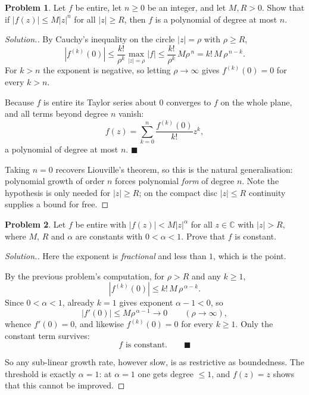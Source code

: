\documentclass[11pt,a4paper]{article}
\theoremstyle{definition}
\newtheorem{problemx}{Problem}[section]
\newenvironment{problem}{\begin{problemx}}{\end{problemx}}
\newenvironment{solution}
  {\renewcommand{\qedsymbol}{}\begin{proof}[\textit{Solution}.]}
  {\end{proof}}
\begin{document}
\begin{problem}
Let $f$ be entire, let $n \geq 0$ be an integer, and let $M, R > 0$. Show that if
$\left|f(z)\right| \leq M\left|z\right|^{n}$ for all $\left|z\right| \geq R$,
then $f$ is a polynomial of degree at most $n$.
\end{problem}

\begin{solution}
By Cauchy's inequality on the circle $\left|z\right| = \rho$ with $\rho \geq R$,
$$\left|f^{(k)}(0)\right| \leq \frac{k!}{\rho^{k}}\max_{\left|z\right|=\rho}\left|f\right|
\leq \frac{k!}{\rho^{k}}\,M\rho^{\,n} = k!\,M\,\rho^{\,n-k}.$$
For $k > n$ the exponent is negative, so letting $\rho \rightarrow \infty$ gives
$f^{(k)}(0) = 0$ for every $k > n$.

Because $f$ is entire its Taylor series about $0$ converges to $f$ on the whole
plane, and all terms beyond degree $n$ vanish:
$$\boxed{f(z) = \sum^{n}_{k=0}\frac{f^{(k)}(0)}{k!}z^{k},}$$
a polynomial of degree at most $n$. $\blacksquare$

Taking $n = 0$ recovers Liouville's theorem, so this is the natural generalisation:
polynomial growth of order $n$ forces polynomial \emph{form} of degree $n$. Note
the hypothesis is only needed for $\left|z\right| \geq R$; on the compact disc
$\left|z\right| \leq R$ continuity supplies a bound for free.
\end{solution}


\begin{problem}
Let $f$ be entire with $\left|f(z)\right| < M\left|z\right|^{\alpha}$ for all
$z \in \mathbb{C}$ with $\left|z\right| > R$, where $M$, $R$ and $\alpha$ are
constants with $0 < \alpha < 1$. Prove that $f$ is constant.
\end{problem}

\begin{solution}
Here the exponent is \emph{fractional} and less than $1$, which is the point.

By the previous problem's computation, for $\rho > R$ and any $k \geq 1$,
$$\left|f^{(k)}(0)\right| \leq k!\,M\,\rho^{\,\alpha-k}.$$
Since $0 < \alpha < 1$, already $k = 1$ gives exponent $\alpha - 1 < 0$, so
$$\left|f'(0)\right| \leq M\rho^{\,\alpha-1} \longrightarrow 0
\qquad (\rho \to \infty),$$
whence $f'(0) = 0$, and likewise $f^{(k)}(0) = 0$ for every $k \geq 1$. Only the
constant term survives:
$$\boxed{f \text{ is constant.}} \qquad \blacksquare$$

So any sub-linear growth rate, however slow, is as restrictive as boundedness. The
threshold is exactly $\alpha = 1$: at $\alpha = 1$ one gets degree $\leq 1$, and
$f(z) = z$ shows that this cannot be improved.
\end{solution}
\end{document}
